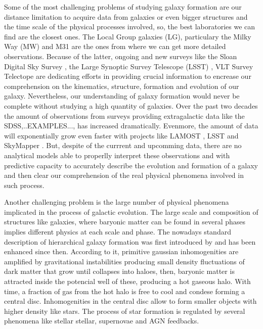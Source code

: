\documentclass[usenatbib]{mn2e}
\begin{document}
Some of the most challenging problems of studying galaxy formation are our distance limitation to acquire data from galaxies or even bigger structures and the time scale of the physical processes involved, so, 
the best laboratories we can find are the closest ones. The Local Group galaxies (LG), particulary the Milky Way (MW) and M31 are the ones from where we can get more detailed observations. Because of the latter,
ongoing and new surveys like the Sloan Digital Sky Survey \citep{2009ApJS..182..543A}, the Large Synoptic Survey Telescope (LSST) \citep{2009arXiv0912.0201L}, VLT Survey Telectope  \citep{2011Msngr.146....2C} are dedicating efforts in providing 
crucial information to encrease our comprehension on the kinematics, structure, formation and evolution of our galaxy.
Nevertheless, our understanding of galaxy formation would never be complete without studying a high quantity of galaxies. Over the past two decades the amount of observations from surveys providing
extragalactic data like the SDSS,..EXAMPLES..., has increased dramatically. Evenmore, the amount of data will exponentially grow even faster with projects like LAMOST \citep{2009AAS...21341614N}, LSST and SkyMapper \citep{2007PASA...24....1K}.
But, despite of the currrent and upcomming  data, there are no analytical models able to properlly interpret these observations and with  predictive capacity  to accurately describe the evolution and
formation of a galaxy and then clear our comprehension of the real physical phenomena involved in such process.


Another challenging problem is the large number of physical phenomena implicated in the process of galactic evolution. The large  scale and composition of structures like galaxies, where baryonic matter
can be found in several phases implies  different physics at each scale and  phase. The nowadays standard description of hierarchical galaxy formation was first introduced by \cite{1978MNRAS.183..341W}
and has been enhanced since then. According to it, primitive gaussian inhomogenities are amplified by gravitational instabilities producing small density fluctuations of dark matter that 
grow until  collapses into  haloes, then, baryonic matter is attracted inside the potencial well of these, producing a hot gaseous halo. With time, a fraction of gas from the hot halo is free to cool 
and condese forming a central disc. Inhomogenities in the central disc allow to form smaller objects with higher density like stars. The process of star formation is regulated by several
phenomena like stellar stellar, supernovae and AGN feedbacks. 
\end{document}
